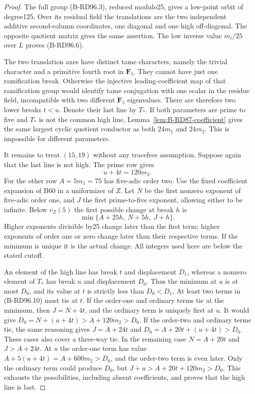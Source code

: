 \begin{proof}
The full group (B-RD96.3), reduced modulo25, gives a low-point
orbit of degree125. Over its residual field the translations
are the two independent additive second-column coordinates,
one diagonal and one high off-diagonal. The opposite quotient
matrix gives the same assertion. The low inverse value $m_i/25$
over $L$ proves (B-RD96.6).

The two translation axes have distinct tame characters, namely
the trivial character and a primitive fourth root in $\mathbf F_5$.
They cannot have just one ramification break. Otherwise the
injective leading-coefficient map of that ramification group
would identify tame conjugation with one scalar in the residue
field, incompatible with two different $\mathbf F_5$ eigenvalues.
There are therefore two lower breaks $t<u$. Denote their last
line by $T_*$. If both parameters are prime to five and $T_*$
is not the common high line, Lemma~\ref{lem:B-RD87-coefficient}
gives the same largest cyclic quotient conductor as both
$24m_1$ and $24m_2$. This is impossible for different parameters.

It remains to treat $(15,19)$ without any tracefree assumption.
Suppose again that the last line is not high. The prime row gives
\[
                           u+4t=120m_2.               \tag{B-RD96.9}
\]
For the other row $A=5m_1=75$ has five-adic order two. Use the
fixed coefficient expansion of B60 in a uniformizer of $Z$.
Let $N$ be the first nonzero exponent of five-adic order one,
and $J$ the first prime-to-five exponent, allowing either to be
infinite. Below $v_Z(5)$ the first possible change at break $h$ is
\[
                 \min\{A+25h,\ N+5h,\ J+h\}.
                                                        \tag{B-RD96.10}
\]
Higher exponents divisible by25 change later than the first term;
higher exponents of order one or zero change later than their
respective terms. If the minimum is unique it is the actual
change. All integers used here are below the stated cutoff.

An element of the high line has break $t$ and displacement $D_1$,
whereas a nonzero element of $T_*$ has break $u$ and displacement
$D_0$. Thus the minimum at $u$ is at most $D_0$, and its value
at $t$ is strictly less than $D_0<D_1$. At least two terms in
(B-RD96.10) must tie at $t$.
If the order-one and ordinary terms tie at the minimum, then
$J=N+4t$, and the ordinary term is uniquely first at $u$.
It would give $D_0=N+(u+4t)>A+120m_2>D_0$.
If the order-two and ordinary terms tie, the same reasoning gives
$J=A+24t$ and $D_0=A+20t+(u+4t)>D_0$.
These cases also cover a three-way tie. In the remaining case
$N=A+20t$ and $J>A+24t$. At $u$ the order-one term has value
$A+5(u+4t)=A+600m_2>D_0$, and the order-two term is even later.
Only the ordinary term could produce $D_0$, but
$J+u>A+20t+120m_2>D_0$. This exhausts the possibilities,
including absent coefficients, and proves that the high line is last.


\end{proof}
